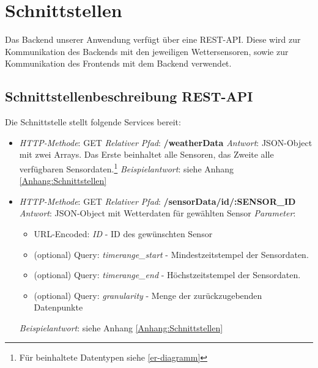 \section{Schnittstellen}\label{Schnittstellen}
Das Backend unserer Anwendung verfügt über eine REST-API.
Diese wird zur Kommunikation des Backends mit den jeweiligen Wettersensoren, sowie zur Kommunikation des Frontends mit dem Backend verwendet.

\subsection*{Schnittstellenbeschreibung REST-API}\label{schnittstellen:rest}
Die Schnittstelle stellt folgende Services bereit:

\begin{itemize}
    \item \textsl{HTTP-Methode}: GET
    \subitem \textsl{Relativer Pfad}: \textbf{/weatherData}
    \subitem \textsl{Antwort}: JSON-Object mit zwei Arrays.
    Das Erste beinhaltet alle Sensoren, das Zweite alle verfügbaren Sensordaten.\footnote{Für beinhaltete Datentypen siehe \cref{er-diagramm}}
    \subitem \textsl{Beispielantwort}: siehe Anhang \ref{Anhang:Schnittstellen}
\end{itemize}

\begin{itemize}
    \item \textsl{HTTP-Methode}: GET
    \subitem \textsl{Relativer Pfad}: \textbf{/sensorData/id/:SENSOR\_ID}
    \subitem \textsl{Antwort}: JSON-Object mit Wetterdaten für gewählten Sensor
    \subitem \textsl{Parameter}: \begin{itemize}
                                     \item URL-Encoded: \textit{ID} - ID des gewünschten Sensor
                                     \item (optional) Query:    \textit{timerange\_start} - Mindestzeitstempel der Sensordaten.
                                     \item (optional) Query:    \textit{timerange\_end} - Höchstzeitstempel der Sensordaten.
                                     \item (optional) Query: \textit{granularity} - Menge der zurückzugebenden Datenpunkte
    \end{itemize}
    \subitem \textsl{Beispielantwort}: siehe Anhang \ref{Anhang:Schnittstellen}
\end{itemize}

